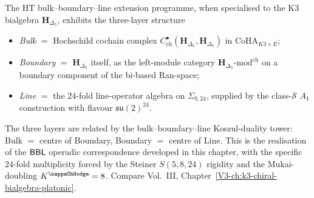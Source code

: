 \begin{remark}
\label{rem:ht-bbl-ext-1}
The HT bulk--boundary--line extension programme, when specialised to
the K3 bialgebra $\mathbf H_{\Delta_5}$, exhibits the
three-layer structure
\begin{itemize}
\item \emph{Bulk} $=$ Hochschild cochain complex
 $C^\bullet_{\mathrm{ch}}(\mathbf H_{\Delta_5}, \mathbf H_{\Delta_5})$
 in $\mathrm{CoHA}_{K3\times E}$;
\item \emph{Boundary} $=$ $\mathbf H_{\Delta_5}$ itself, as the
 left-module category $\mathbf H_{\Delta_5}\text{-}\mathrm{mod}^{\mathrm{ch}}$
 on a boundary component of the bi-based Ran-space;
\item \emph{Line} $=$ the $24$-fold line-operator algebra on
 $\Sigma_{0,24}$, supplied by the class-$\mathcal S$ $A_1$
 construction with flavour $\mathfrak{su}(2)^{24}$.
\end{itemize}
The three layers are related by the bulk--boundary--line
Koszul-duality tower: Bulk $=$ centre of Boundary, Boundary $=$ centre
of Line. This is the realisation of the ${\sf BBL}$ operadic
correspondence developed in this chapter, with the specific $24$-fold
multiplicity forced by the Steiner $S(5,8,24)$ rigidity and the
Mukai-doubling $K^{\kappaChHodge} = 8$. Compare Vol.~III,
Chapter~\ref{V3-ch:k3-chiral-bialgebra-platonic}.
\end{remark}
